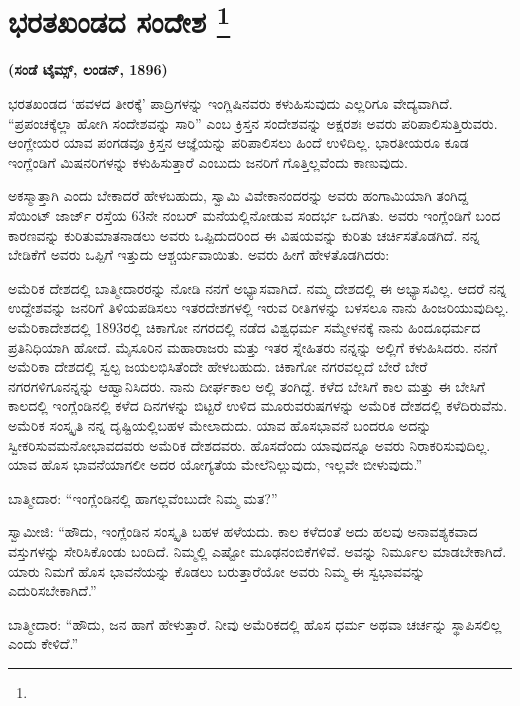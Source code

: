 
\chapter[ಭರತಖಂಡದ ಸಂದೇಶ ]{ಭರತಖಂಡದ ಸಂದೇಶ \protect\footnote{}}

\centerline{\textbf{(ಸಂಡೆ ಟೈಮ್ಸ್, ಲಂಡನ್​, 1896)}}

ಭರತಖಂಡದ ‘ಹವಳದ ತೀರಕ್ಕೆ’ ಪಾದ್ರಿಗಳನ್ನು ಇಂಗ್ಲಿಷಿನವರು ಕಳುಹಿಸುವುದು ಎಲ್ಲರಿಗೂ ವೇದ್ಯವಾಗಿದೆ. “ಪ್ರಪಂಚಕ್ಕೆಲ್ಲಾ ಹೋಗಿ ಸಂದೇಶವನ್ನು ಸಾರಿ” ಎಂಬ ಕ್ರಿಸ್ತನ ಸಂದೇಶವನ್ನು ಅಕ್ಷರಶಃ ಅವರು ಪರಿಪಾಲಿಸುತ್ತಿರುವರು. ಆಂಗ್ಲೇಯರ ಯಾವ ಪಂಗಡವೂ ಕ್ರಿಸ್ತನ ಆಜ್ಞೆಯನ್ನು ಪರಿಪಾಲಿಸಲು ಹಿಂದೆ ಉಳಿದಿಲ್ಲ. ಭಾರತೀಯರೂ ಕೂಡ ಇಂಗ್ಲೆಂಡಿಗೆ ಮಿಷನರಿಗಳನ್ನು ಕಳುಹಿಸುತ್ತಾರೆ ಎಂಬುದು ಜನರಿಗೆ ಗೊತ್ತಿಲ್ಲವೆಂದು ಕಾಣುವುದು.

ಅಕಸ್ಮಾತ್ತಾಗಿ ಎಂದು ಬೇಕಾದರೆ ಹೇಳಬಹುದು, ಸ್ವಾಮಿ ವಿವೇಕಾನಂದರನ್ನು ಅವರು ಹಂಗಾಮಿಯಾಗಿ ತಂಗಿದ್ದ ಸೆಯಿಂಟ್​ ಜಾರ್ಜ್​ ರಸ್ತೆಯ 63ನೇ ನಂಬರ್​ ಮನೆಯಲ್ಲಿ\break ನೋಡುವ ಸಂದರ್ಭ ಒದಗಿತು. ಅವರು ಇಂಗ್ಲೆಂಡಿಗೆ ಬಂದ ಕಾರಣವನ್ನು ಕುರಿತು\break ಮಾತನಾಡಲು ಅವರು ಒಪ್ಪಿದುದರಿಂದ ಈ ವಿಷಯವನ್ನು ಕುರಿತು ಚರ್ಚಿಸತೊಡಗಿದೆ. ನನ್ನ ಬೇಡಿಕೆಗೆ ಅವರು ಒಪ್ಪಿಗೆ ಇತ್ತುದು ಆಶ್ಚರ್ಯವಾಯಿತು. ಅವರು ಹೀಗೆ ಹೇಳ\-ತೊಡಗಿದರು:

ಅಮೆರಿಕ ದೇಶದಲ್ಲಿ ಬಾತ್ಮೀದಾರರನ್ನು ನೋಡಿ ನನಗೆ ಅಭ್ಯಾಸವಾಗಿದೆ. ನಮ್ಮ ದೇಶದಲ್ಲಿ ಈ ಅಭ್ಯಾಸವಿಲ್ಲ. ಆದರೆ ನನ್ನ ಉದ್ದೇಶವನ್ನು ಜನರಿಗೆ ತಿಳಿಯಪಡಿಸಲು ಇತರ\break ದೇಶಗಳಲ್ಲಿ ಇರುವ ರೀತಿಗಳನ್ನು ಬಳಸಲೂ ನಾನು ಹಿಂಜರಿಯುವುದಿಲ್ಲ. ಅಮೆರಿಕಾ\break ದೇಶದಲ್ಲಿ 1893ರಲ್ಲಿ ಚಿಕಾಗೋ ನಗರದಲ್ಲಿ ನಡೆದ ವಿಶ್ವಧರ್ಮ ಸಮ್ಮೇಳನಕ್ಕೆ ನಾನು ಹಿಂದೂಧರ್ಮದ ಪ್ರತಿನಿಧಿಯಾಗಿ ಹೋದೆ. ಮೈಸೂರಿನ ಮಹಾರಾಜರು ಮತ್ತು ಇತರ ಸ್ನೇಹಿತರು ನನ್ನನ್ನು ಅಲ್ಲಿಗೆ ಕಳುಹಿಸಿದರು. ನನಗೆ ಅಮೆರಿಕಾ ದೇಶದಲ್ಲಿ ಸ್ವಲ್ಪ ಜಯ\break ಲಭಿಸಿತೆಂದೇ ಹೇಳಬಹುದು. ಚಿಕಾಗೋ ನಗರವಲ್ಲದೆ ಬೇರೆ ಬೇರೆ ನಗರಗಳಿಗೂ\break ನನ್ನನ್ನು ಆಹ್ವಾನಿಸಿದರು. ನಾನು ದೀರ್ಘಕಾಲ ಅಲ್ಲಿ ತಂಗಿದ್ದೆ. ಕಳೆದ ಬೇಸಿಗೆ ಕಾಲ ಮತ್ತು ಈ ಬೇಸಿಗೆ ಕಾಲದಲ್ಲಿ ಇಂಗ್ಲೆಂಡಿನಲ್ಲಿ ಕಳೆದ ದಿನಗಳನ್ನು ಬಿಟ್ಟರೆ ಉಳಿದ ಮೂರು\break ವರುಷಗಳನ್ನು ಅಮೆರಿಕ ದೇಶದಲ್ಲಿ ಕಳೆದಿರುವೆನು. ಅಮೆರಿಕ ಸಂಸ್ಕೃತಿ ನನ್ನ ದೃಷ್ಟಿಯಲ್ಲಿ\break ಬಹಳ ಮೇಲಾದುದು. ಯಾವ ಹೊಸಭಾವನೆ ಬಂದರೂ ಅದನ್ನು ಸ್ವೀಕರಿಸುವ\break ಮನೋಭಾವದವರು ಅಮೆರಿಕ ದೇಶದವರು. ಹೊಸದೆಂದು ಯಾವುದನ್ನೂ ಅವರು ನಿರಾಕರಿಸುವುದಿಲ್ಲ. ಯಾವ ಹೊಸ ಭಾವನೆಯಾಗಲೀ ಅದರ ಯೋಗ್ಯತೆಯ ಮೇಲೆ\break ನಿಲ್ಲುವುದು, ಇಲ್ಲವೇ ಬೀಳುವುದು.”

ಬಾತ್ಮೀದಾರ: “ಇಂಗ್ಲೆಂಡಿನಲ್ಲಿ ಹಾಗಲ್ಲವೆಂಬುದೇ ನಿಮ್ಮ ಮತ?”

ಸ್ವಾಮೀಜಿ: “ಹೌದು, ಇಂಗ್ಲೆಂಡಿನ ಸಂಸ್ಕೃತಿ ಬಹಳ ಹಳೆಯದು. ಕಾಲ ಕಳೆದಂತೆ ಅದು ಹಲವು ಅನಾವಶ್ಯಕವಾದ ವಸ್ತುಗಳನ್ನು ಸೇರಿಸಿಕೊಂಡು ಬಂದಿದೆ. ನಿಮ್ಮಲ್ಲಿ ಎಷ್ಟೋ ಮೂಢನಂಬಿಕೆಗಳಿವೆ. ಅವನ್ನು ನಿರ್ಮೂಲ ಮಾಡಬೇಕಾಗಿದೆ. ಯಾರು ನಿಮಗೆ ಹೊಸ ಭಾವನೆಯನ್ನು ಕೊಡಲು ಬರುತ್ತಾರೆಯೋ ಅವರು ನಿಮ್ಮ ಈ ಸ್ವಭಾವವನ್ನು ಎದುರಿಸಬೇಕಾಗಿದೆ.”

ಬಾತ್ಮೀದಾರ: “ಹೌದು, ಜನ ಹಾಗೆ ಹೇಳುತ್ತಾರೆ. ನೀವು ಅಮೆರಿಕದಲ್ಲಿ ಹೊಸ ಧರ್ಮ ಅಥವಾ ಚರ್ಚನ್ನು ಸ್ಥಾಪಿಸಲಿಲ್ಲ ಎಂದು ಕೇಳಿದೆ.”

